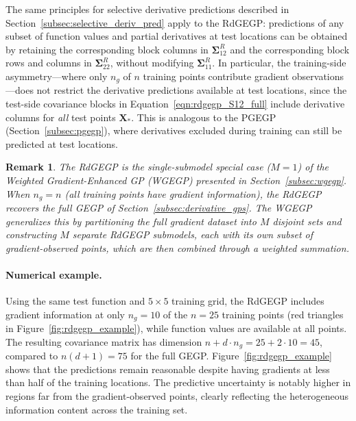 \documentclass[12pt]{article}
\newtheorem{remark}{Remark}
\begin{document}
The same principles for selective derivative predictions described in Section~\ref{subsec:selective_deriv_pred} apply to the RdGEGP: predictions of any subset of function values and partial derivatives at test locations can be obtained by retaining the corresponding block columns in $\boldsymbol{\Sigma}^{R}_{12}$ and the corresponding block rows and columns in $\boldsymbol{\Sigma}^{R}_{22}$, without modifying $\boldsymbol{\Sigma}^{R}_{11}$. In particular, the training-side asymmetry---where only $n_g$ of $n$ training points contribute gradient observations---does not restrict the derivative predictions available at test locations, since the test-side covariance blocks in Equation~\eqref{eqn:rdgegp_S12_full} include derivative columns for \emph{all} test points $\mathbf{X}_*$. This is analogous to the PGEGP (Section~\ref{subsec:pgegp}), where derivatives excluded during training can still be predicted at test locations.

\begin{remark}
	The RdGEGP is the single-submodel special case ($M = 1$) of the Weighted Gradient-Enhanced GP (WGEGP) presented in Section~\ref{subsec:wgegp}. When $n_g = n$ (all training points have gradient information), the RdGEGP recovers the full GEGP of Section~\ref{subsec:derivative_gps}. The WGEGP generalizes this by partitioning the full gradient dataset into $M$ disjoint sets and constructing $M$ separate RdGEGP submodels, each with its own subset of gradient-observed points, which are then combined through a weighted summation.
\end{remark}

\paragraph{Numerical example.}
Using the same test function and $5 \times 5$ training grid, the RdGEGP includes gradient information at only $n_g = 10$ of the $n = 25$ training points (red triangles in Figure~\ref{fig:rdgegp_example}), while function values are available at all points. The resulting covariance matrix has dimension $n + d \cdot n_g = 25 + 2 \cdot 10 = 45$, compared to $n(d + 1) = 75$ for the full GEGP. Figure~\ref{fig:rdgegp_example} shows that the predictions remain reasonable despite having gradients at less than half of the training locations. The predictive uncertainty is notably higher in regions far from the gradient-observed points, clearly reflecting the heterogeneous information content across the training set.
\end{document}
